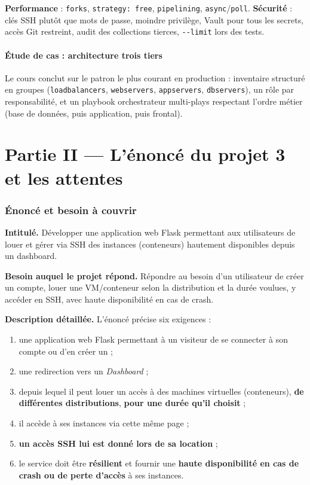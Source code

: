 \documentclass[11pt,a4paper]{article}
\begin{document}
\textbf{Performance} : \texttt{forks}, \texttt{strategy: free}, \texttt{pipelining}, \texttt{async}/\texttt{poll}.
\textbf{Sécurité} : clés SSH plutôt que mots de passe, moindre privilège, Vault pour tous les secrets,
accès Git restreint, audit des collections tierces, \texttt{-{}-limit} lors des tests.

\subsection{Étude de cas : architecture trois tiers}
Le cours conclut sur le patron le plus courant en production : inventaire structuré en groupes
(\texttt{loadbalancers}, \texttt{webservers}, \texttt{appservers}, \texttt{dbservers}), un rôle par
responsabilité, et un playbook orchestrateur multi-plays respectant l'ordre métier (base de données,
puis application, puis frontal).

\clearpage
\part*{Partie II --- L'énoncé du projet 3 et les attentes}

\section{Énoncé et besoin à couvrir}

\textbf{Intitulé.} \og{}Développer une application web Flask permettant aux utilisateurs de louer et gérer
via SSH des instances (conteneurs) hautement disponibles depuis un dashboard.\fg{}

\textbf{Besoin auquel le projet répond.} \og{}Répondre au besoin d'un utilisateur de créer un compte, louer
une VM/conteneur selon la distribution et la durée voulues, y accéder en SSH, avec haute disponibilité
en cas de crash.\fg{}

\textbf{Description détaillée.} L'énoncé précise six exigences :
\begin{enumerate}
\item une application web Flask permettant à un visiteur de se connecter à son compte ou d'en créer un ;
\item une redirection vers un \emph{Dashboard} ;
\item depuis lequel il peut louer un accès à des machines virtuelles (conteneurs), \textbf{de différentes
distributions}, \textbf{pour une durée qu'il choisit} ;
\item il accède à ses instances via cette même page ;
\item \textbf{un accès SSH lui est donné lors de sa location} ;
\item le service doit être \textbf{résilient} et fournir une \textbf{haute disponibilité en cas de crash ou
de perte d'accès} à ses instances.
\end{enumerate}
\end{document}

